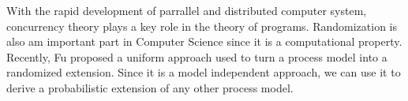 
\begin{bigabstract}
  With the rapid development of parrallel and distributed computer system,
  concurrency theory plays a key role in the theory of programs.
  Randomization is also am important part in Computer Science since it is a computational property. 
  Recently, Fu proposed a uniform approach
  used to turn a process model into a randomized extension.
  Since it is a model independent approach,
  we can use it to derive a probabilistic extension of 
  any other process model.

\end{bigabstract}
